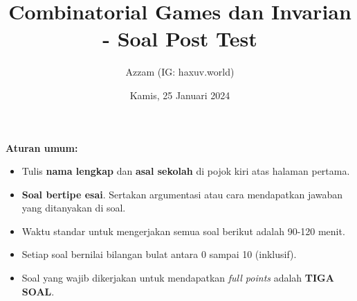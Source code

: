 \documentclass[11pt]{scrartcl}
\title{Combinatorial Games dan Invarian - Soal Post Test}
\author{Azzam (IG: haxuv.world)}
\date{Kamis, 25 Januari 2024}
\begin{document}
\maketitle
\textbf{Aturan umum:}
\begin{itemize}
    \item Tulis \textbf{nama lengkap} dan \textbf{asal sekolah} di pojok kiri atas halaman pertama.
    \item \textbf{Soal bertipe esai}. Sertakan argumentasi atau cara mendapatkan jawaban yang ditanyakan di soal.
    \item Waktu standar untuk mengerjakan semua soal berikut adalah 90-120 menit.
    \item Setiap soal bernilai bilangan bulat antara 0 sampai 10 (inklusif).
    \item Soal yang wajib dikerjakan untuk mendapatkan \textit{full points} adalah \textbf{TIGA SOAL}.
\end{itemize}
\end{document}
